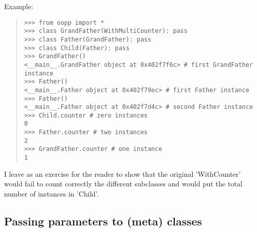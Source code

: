 \documentclass[10pt,english]{article}
\begin{document}
Example:
\begin{quote}
\begin{verbatim}>>> from oopp import *
>>> class GrandFather(WithMultiCounter): pass
>>> class Father(GrandFather): pass
>>> class Child(Father): pass
>>> GrandFather()
<__main__.GrandFather object at 0x402f7f6c> # first GrandFather instance
>>> Father()
<__main__.Father object at 0x402f79ec> # first Father instance
>>> Father()
<__main__.Father object at 0x402f7d4c> # second Father instance
>>> Child.counter # zero instances
0
>>> Father.counter # two instances
2
>>> GrandFather.counter # one instance
1\end{verbatim}
\end{quote}

I leave as an exercise for the reader to show that the original 'WithCounter'
would fail to count correctly the different subclasses and would put the 
total number of instances in 'Child'.



\hypertarget{passing-parameters-to-meta-classes}{}
\subsection*{Passing parameters to (meta) classes}
\end{document}
